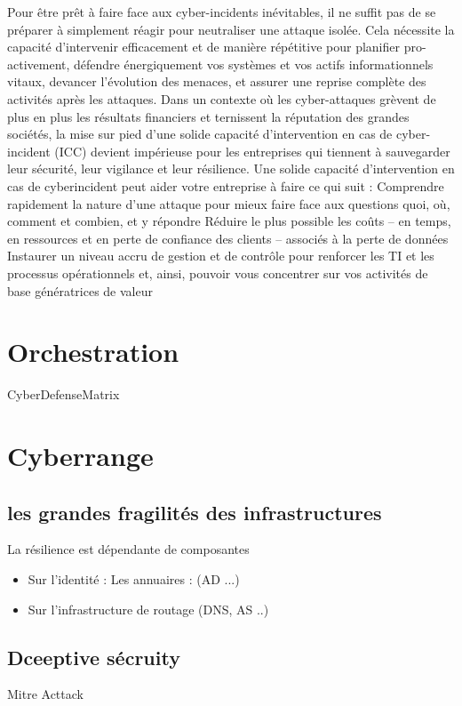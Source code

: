 



Pour être prêt à faire face aux cyber-incidents inévitables, il ne suffit pas de se préparer à simplement réagir pour neutraliser une attaque isolée. Cela nécessite la capacité d’intervenir efficacement et de manière répétitive pour planifier pro-activement, défendre énergiquement vos systèmes et vos actifs informationnels vitaux, devancer l’évolution des menaces, et assurer une reprise complète des activités après
les attaques.
Dans un contexte où les cyber-attaques grèvent de plus en plus les résultats financiers et ternissent la réputation des grandes sociétés, la mise sur pied d’une solide capacité d’intervention en cas de cyber-incident (ICC) devient impérieuse pour les entreprises qui tiennent à sauvegarder leur sécurité, leur vigilance et leur résilience. Une solide capacité d’intervention en cas de cyberincident peut aider votre entreprise à faire ce qui suit :
Comprendre rapidement la nature d’une attaque pour mieux faire face aux questions quoi, où, comment et combien, et y répondre
Réduire le plus possible les coûts – en temps, en ressources et en perte de confiance des clients – associés à la perte de données
Instaurer un niveau accru de gestion et de contrôle pour renforcer les TI et les processus opérationnels et, ainsi, pouvoir vous concentrer sur vos activités de base génératrices de valeur

\section{Orchestration}

CyberDefenseMatrix  \cite{dutta2019cyber}

\section{Cyberrange}



\subsection {les grandes fragilités des infrastructures}

La résilience est dépendante de composantes 
\begin{itemize}
  \item Sur l'identité : Les annuaires : (AD ...)
  \item Sur l'infrastructure de routage (DNS, AS ..)
\end{itemize}

\subsection {Dceeptive sécruity}
Mitre Acttack


